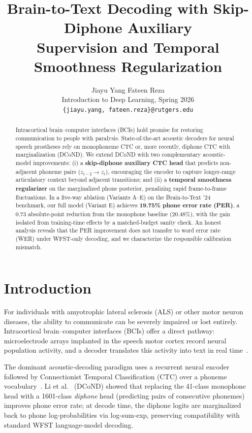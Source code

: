 \documentclass[10pt,twocolumn]{article}
\title{\textbf{Brain-to-Text Decoding with Skip-Diphone Auxiliary\\
Supervision and Temporal Smoothness Regularization}}
\author{
  Jiayu Yang \quad Fateen Reza \\
  \small Introduction to Deep Learning, Spring 2026 \\
  \small \texttt{\{jiayu.yang, fateen.reza\}@rutgers.edu}
}
\date{}
\begin{document}
\maketitle

\begin{abstract}
Intracortical brain--computer interfaces (BCIs) hold promise for restoring
communication to people with paralysis.  State-of-the-art acoustic decoders
for neural speech prostheses rely on monophoneme CTC or, more recently,
diphone CTC with marginalization (DCoND).  We extend DCoND with two
complementary acoustic-model improvements: (i) a \textbf{skip-diphone
auxiliary CTC head} that predicts non-adjacent phoneme pairs
($z_{t-2}\!\to\!z_t$), encouraging the encoder to capture longer-range
articulatory context beyond adjacent transitions; and (ii) a
\textbf{temporal smoothness regularizer} on the marginalized phone
posterior, penalizing rapid frame-to-frame fluctuations.  In a five-way
ablation (Variants A--E) on the Brain-to-Text '24 benchmark, our full model
(Variant E) achieves \textbf{19.75\% phone error rate (PER)}, a 0.73
absolute-point reduction from the monophone baseline (20.48\%), with the
gain isolated from training-time effects by a matched-budget sanity check.
An honest analysis reveals that the PER improvement does not transfer to
word error rate (WER) under WFST-only decoding, and we characterize the
responsible calibration mismatch.
\end{abstract}

\section{Introduction}

For individuals with amyotrophic lateral sclerosis (ALS) or other motor
neuron diseases, the ability to communicate can be severely impaired or
lost entirely.  Intracortical brain--computer interfaces (BCIs) offer a
direct pathway: microelectrode arrays implanted in the speech motor cortex
record neural population activity, and a decoder translates this activity
into text in real time~\cite{willett2023}.

The dominant acoustic-decoding paradigm uses a recurrent neural encoder
followed by Connectionist Temporal Classification (CTC) over a phoneme
vocabulary~\cite{willett2023}.  Li et al.~\cite{dcond2024} (DCoND)
showed that replacing the 41-class monophone head with a 1601-class
\emph{diphone} head (predicting pairs of consecutive phonemes) improves
phone error rate; at decode time, the diphone logits are marginalized back
to phone log-probabilities via log-sum-exp, preserving compatibility with
standard WFST language-model decoding.
\end{document}
